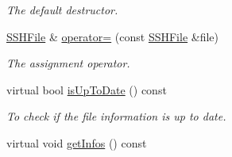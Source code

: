 \begin{DoxyCompactItemize}
\begin{DoxyCompactList}\small\item\em The default destructor. \item\end{DoxyCompactList}\item 
\hyperlink{classSSHFile}{SSHFile} \& \hyperlink{classSSHFile_a280279aad1796b206d20ddc131639ce1}{operator=} (const \hyperlink{classSSHFile}{SSHFile} \&file)
\begin{DoxyCompactList}\small\item\em The assignment operator. \item\end{DoxyCompactList}\item 
virtual bool \hyperlink{classSSHFile_a61ad8e108ad9027310e010ab5ab96ca9}{isUpToDate} () const 
\begin{DoxyCompactList}\small\item\em To check if the file information is up to date. \item\end{DoxyCompactList}\item 
\hypertarget{classSSHFile_acd2966c1e960a2b5a958dff1dcdfb780}{
virtual void \hyperlink{classSSHFile_acd2966c1e960a2b5a958dff1dcdfb780}{getInfos} () const }
\label{classSSHFile_acd2966c1e960a2b5a958dff1dcdfb780}


\end{DoxyCompactItemize}
